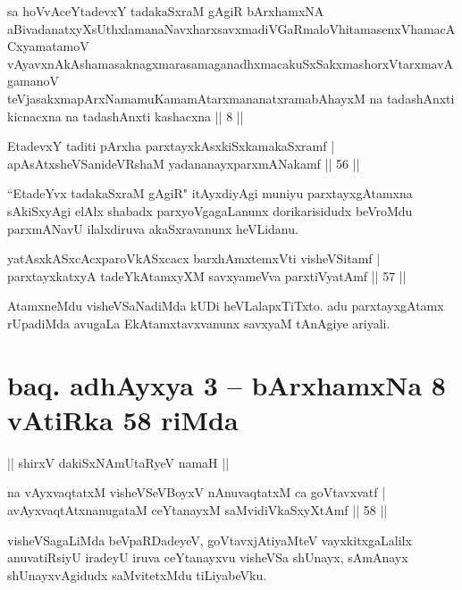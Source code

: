 \begin{shl}
sa hoVvAceYtadevxY tadakaSxraM gAgiR bArxhamxNA aBivadanatxyXsUthxlamanaNavxharxsavxmadiVGaRmaloVhitamasenxVhamacACxyamatamoV\s \\ vAyavxnAkAshamasaknagxmarasamaganadhxmacakuSxSakxmashorxVtarxmavAgamanoV\s\\ teVjasakxmapArxNamamuKamamAtarxmananatxramabAhayxM na tadashAnxti kicnacxna na tadashAnxti kashacxna || 8 ||
\end{shl}

\begin{shl}
EtadevxY taditi pArxha parxtayxkAsxkiSxkamakaSxramf |\\
apAsAtxsheVSanideVRshaM yadananayxparxmANakamf \hfill || 56 ||
\end{shl}

\begin{artha}
``EtadeYvx tadakaSxraM gAgiR" itAyxdiyAgi muniyu parxtayxgAtamxna sAkiSxyAgi elAlx shabadx parxyoVgagaLanunx dorikarisidudx beVroMdu parxmANavU ilalxdiruva akaSxravanunx heVLidanu.
\end{artha}

\begin{shl}
yatAsxkASxcAcxparoVkASxcacx barxhAmxtemxVti visheVSitamf |\\
parxtayxkatxyA tadeYkAtamxyXM savxyameVva parxtiVyatAmf \hfill || 57 ||
\end{shl}

\begin{artha}
AtamxneMdu visheVSaNadiMda kUDi heVLalapxTiTxto. adu parxtayxgAtamx rUpadiMda avugaLa EkAtamxtavxvanunx savxyaM tAnAgiye ariyali.
\end{artha}%

\section*{baq. adhAyxya 3 -- bArxhamxNa 8 vAtiRka 58 riMda}

\begin{center}%
|| shirxV dakiSxNAmUtaRyeV namaH ||
\end{center}

\begin{shl}
na vAyxvaqtatxM visheVSeVBoyxV nAnuvaqtatxM ca goVtavxvatf |\\
avAyxvaqtAtxnanugataM ceYtanayxM saMvidiVkaSxyXtAmf \hfill || 58 ||
\end{shl}

\begin{artha}
visheVSagaLiMda beVpaRDadeyeV, goVtavxjAtiyaMteV vayxkitxgaLalilx anuvatiRsiyU iradeyU iruva ceYtanayxvu visheVSa shUnayx, sAmAnayx shUnayxvAgidudx saMvitetxMdu tiLiyabeVku.
\end{artha}

